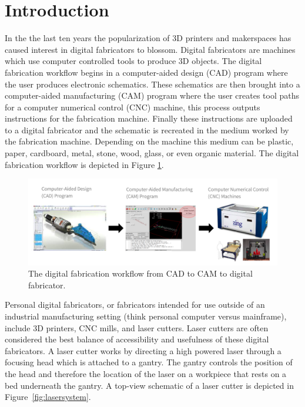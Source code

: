 \section{Introduction}

In the the last ten years the popularization of 3D printers and makerspaces has caused interest in digital fabricators to blossom. Digital fabricators are machines which use computer controlled tools to produce 3D objects. The digital fabrication workflow begins in a computer-aided design (CAD) program where the user produces electronic schematics. These schematics are then brought into a computer-aided manufacturing (CAM) program where the user creates tool paths for a computer numerical control (CNC) machine, this process outputs instructions for the fabrication machine. Finally these instructions are uploaded to a digital fabricator and the schematic is recreated in the medium worked by the fabrication machine. Depending on the machine this medium can be plastic, paper, cardboard, metal, stone, wood, glass, or even organic material. The digital fabrication workflow is depicted in Figure \ref{fig:digiFabWorkflow}.

\begin{figure}[H]
  \includegraphics[width=\linewidth]{digiFabWorkflow.jpg}
  \caption{The digital fabrication workflow from CAD to CAM to digital fabricator.}
  \label{fig:digiFabWorkflow}
\end{figure}

Personal digital fabricators, or fabricators intended for use outside of an industrial manufacturing setting (think personal computer versus mainframe), include 3D printers, CNC mills, and laser cutters. Laser cutters are often considered the best balance of accessibility and usefulness of these digital fabricators. A laser cutter works by directing a high powered laser through a focusing head which is attached to a gantry. The gantry controls the position of the head and therefore the location of the laser on a workpiece that rests on a bed underneath the gantry. A top-view schematic of a laser cutter is depicted in Figure~\ref{fig:lasersystem}.

